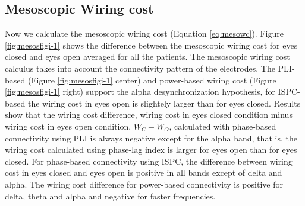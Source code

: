 \documentclass[11pt, onecolumn]{article}
\begin{document}

\subsection{Mesoscopic Wiring cost} %
Now we calculate the mesoscopic wiring cost (Equation \ref{eq:mesowc}). Figure \ref{fig:mesosfigi-1} shows the difference between the mesoscopic wiring cost for eyes closed and eyes open averaged for all the patients.
The mesoscopic wiring cost calculus takes into account the connectivity pattern of the electrodes. The PLI-based (Figure \ref{fig:mesosfigi-1} center) and power-based wiring cost (Figure \ref{fig:mesosfigi-1} right) support the alpha desynchronization hypothesis, for ISPC-based the wiring cost in eyes open is slightely larger than for eyes closed.
Results show that the wiring cost difference, wiring cost in eyes closed condition minus wiring cost in eyes open condition, $W_C - W_O$, calculated with phase-based connectivity using PLI is always negative except for the alpha band, that is, the wiring cost calculated using phase-lag index is larger for eyes open than for eyes closed. 
For phase-based connectivity using ISPC, the difference between wiring cost in eyes closed and eyes open is positive in all bands except of delta and alpha. The wiring cost difference for power-based connectivity is positive for delta, theta and alpha and negative for faster frequencies. 
\end{document}
